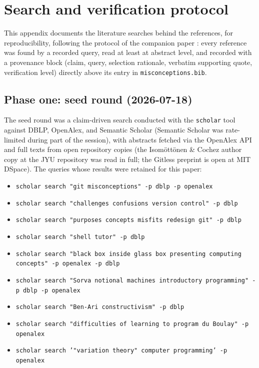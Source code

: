 \mode*
\section{Search and verification protocol}
\label{app:protocol}

This appendix documents the literature searches behind the references, for
reproducibility, following the protocol of the companion paper
\autocite[App.~literature protocol]{VTProgMisconceptions}: every reference
was found by a recorded query, read at least at abstract level, and
recorded with a provenance block (claim, query, selection rationale,
verbatim supporting quote, verification level) directly above its entry in
\texttt{misconceptions.bib}.

\subsection{Phase one: seed round (2026-07-18)}

The seed round was a claim-driven search conducted with the
\texttt{scholar} tool against DBLP, OpenAlex, and Semantic Scholar
(Semantic Scholar was rate-limited during part of the session), with
abstracts fetched via the OpenAlex API and full texts from open repository
copies (the Isomöttönen \& Cochez author copy at the JYU repository was
read in full; the Gitless preprint is open at MIT DSpace).
The queries whose results were retained for this paper:

\begin{itemize}
  \item \texttt{scholar search "git misconceptions" -p dblp -p openalex}
  \item \texttt{scholar search "challenges confusions version control" -p dblp}
  \item \texttt{scholar search "purposes concepts misfits redesign git" -p dblp}
  \item \texttt{scholar search "shell tutor" -p dblp}
  \item \texttt{scholar search "black box inside glass box presenting computing concepts" -p openalex -p dblp}
  \item \texttt{scholar search "Sorva notional machines introductory programming" -p dblp -p openalex}
  \item \texttt{scholar search "Ben-Ari constructivism" -p dblp}
  \item \texttt{scholar search "difficulties of learning to program du Boulay" -p openalex}
  \item \texttt{scholar search '"variation theory" computer programming' -p openalex}
\end{itemize}

